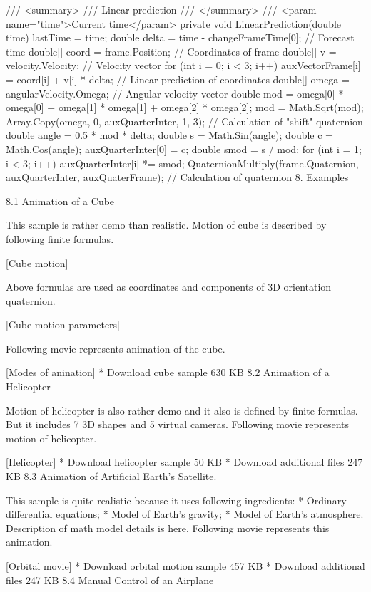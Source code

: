 \documentclass[10pt,journal,compsoc]{IEEEtran}
\begin{document}
/// <summary>
/// Linear prediction
/// </summary>
/// <param name="time">Current time</param>
private void LinearPrediction(double time)
{
	lastTime = time;
	double delta = time - changeFrameTime[0]; // Forecast time
	double[] coord = frame.Position;          // Coordinates of frame
	double[] v = velocity.Velocity;           // Velocity vector
	for (int i = 0; i < 3; i++)
	{
		auxVectorFrame[i] = coord[i] + v[i] * delta; // Linear prediction of coordinates
	}
	double[] omega = angularVelocity.Omega; // Angular velocity vector
	double mod = omega[0] * omega[0] + omega[1] * omega[1] + omega[2] * omega[2];
	mod = Math.Sqrt(mod);
	Array.Copy(omega, 0, auxQuarterInter, 1, 3); // Calculation of "shift" quaternion
	double angle = 0.5 * mod * delta;
	double s = Math.Sin(angle);
	double c = Math.Cos(angle);
	auxQuarterInter[0] = c;
	double smod = s / mod;
	for (int i = 1; i < 3; i++)
	{
		auxQuarterInter[i] *= smod;
	}
	QuaternionMultiply(frame.Quaternion, auxQuarterInter, auxQuaterFrame); // Calculation of quaternion
}
8. Examples

8.1 Animation of a Cube

This sample is rather demo than realistic. Motion of cube is described by following finite formulas.

[Cube motion]

Above formulas are used as coordinates and components of 3D orientation quaternion.

[Cube motion parameters]

Following movie represents animation of the cube.

{[Modes of anination]}
* {Download cube sample 630 KB} 
8.2 Animation of a Helicopter

Motion of helicopter is also rather demo and it also is defined by finite formulas. But it includes 7 3D shapes and 5 virtual cameras. Following movie represents motion of helicopter.

{[Helicopter]}
* {Download helicopter sample 50 KB} 
* {Download additional files 247 KB} 
8.3 Animation of Artificial Earth's Satellite.

This sample is quite realistic because it uses following ingredients:
* Ordinary differential equations; 
* Model of {Earth's gravity}; 
* Model of {Earth's atmosphere}. 
Description of math model details is {here}. Following movie represents this animation.

{[Orbital movie]}
* {Download orbital motion sample 457 KB} 
* {Download additional files 247 KB} 
8.4 Manual Control of an Airplane
\end{document}
